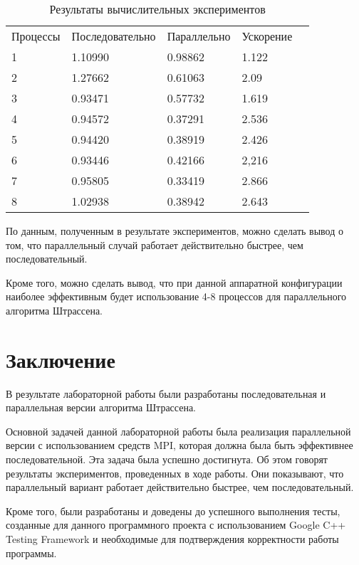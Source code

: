 \documentclass{report}
\begin{document}
\begin{table}[!h]
\caption{Результаты вычислительных экспериментов}
\centering
\begin{tabular}{lllll}
Процессы & Последовательно & Параллельно & Ускорение   \\
1        & 1.10990         & 0.98862     & 1.122       \\
2        & 1.27662         & 0.61063     & 2.09        \\
3        & 0.93471         & 0.57732     & 1.619       \\
4        & 0.94572         & 0.37291     & 2.536       \\
5        & 0.94420         & 0.38919     & 2.426       \\
6        & 0.93446         & 0.42166     & 2,216       \\
7        & 0.95805         & 0.33419     & 2.866       \\
8        & 1.02938         & 0.38942     & 2.643       \\
\end{tabular}
\end{table}
\par По данным, полученным в результате экспериментов, можно сделать вывод о том, что параллельный случай работает действительно быстрее, чем последовательный. 
\par Кроме того, можно сделать вывод, что при данной аппаратной конфигурации наиболее эффективным будет использование 4-8 процессов для параллельного алгоритма Штрассена.
\newpage

\section*{Заключение}
В результате лабораторной работы были разработаны последовательная и параллельная версии алгоритма Штрассена.
\par Основной задачей данной лабораторной работы была реализация параллельной версии с использованием средств MPI, которая должна была быть эффективнее последовательной. Эта задача была успешно достигнута. Об этом говорят результаты экспериментов, проведенных в ходе работы. Они показывают, что параллельный вариант работает действительно быстрее, чем последовательный. 
\par Кроме того, были разработаны и доведены до успешного выполнения тесты, созданные для данного программного проекта с использованием Google C++ Testing Framework и необходимые для подтверждения корректности работы программы.
\newpage
\end{document}
